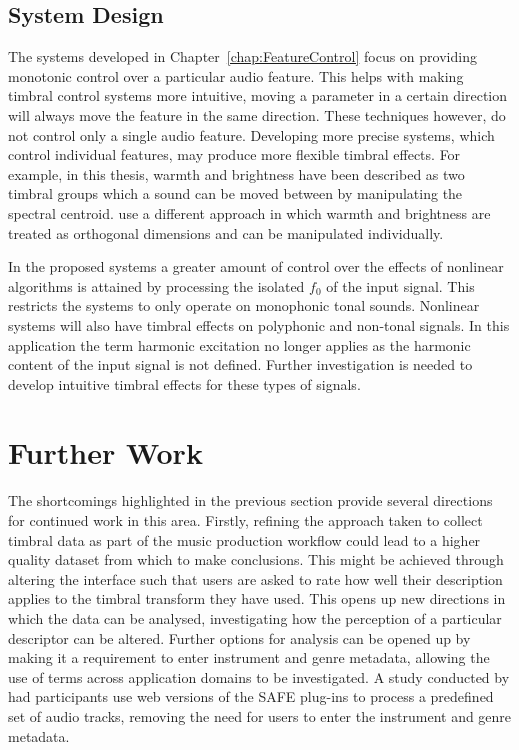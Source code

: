 	\subsection{System Design}
	\label{sec:Conclusion-Critique-SystemDesign}
		The systems developed in Chapter~\ref{chap:FeatureControl} focus on providing monotonic control over a
		particular audio feature. This helps with making timbral control systems more intuitive, moving a parameter
		in a certain direction will always move the feature in the same direction. These techniques however, do not
		control only a single audio feature. Developing more precise systems, which control individual features, may
		produce more flexible timbral effects. For example, in this thesis, warmth and brightness have been
		described as two timbral groups which a sound can be moved between by manipulating the spectral centroid.
		\cite{zacharakis2011an} use a different approach in which warmth and brightness are treated as orthogonal
		dimensions and can be manipulated individually.

		In the proposed systems a greater amount of control over the effects of nonlinear algorithms is attained by
		processing the isolated $f_{0}$ of the input signal. This restricts the systems to only operate on
		monophonic tonal sounds. Nonlinear systems will also have timbral effects on polyphonic and non-tonal
		signals. In this application the term harmonic excitation no longer applies as the harmonic content of the
		input signal is not defined. Further investigation is needed to develop intuitive timbral effects for these
		types of signals.

\section{Further Work}
\label{sec:Conclusion-FurtherWork}
	The shortcomings highlighted in the previous section provide several directions for continued work in this area.
	Firstly, refining the approach taken to collect timbral data as part of the music production workflow could lead to
	a higher quality dataset from which to make conclusions. This might be achieved through altering the interface such
	that users are asked to rate how well their description applies to the timbral transform they have used. This
	opens up new directions in which the data can be analysed, investigating how the perception of a particular
	descriptor can be altered. Further options for analysis can be opened up by making it a requirement to enter
	instrument and genre metadata, allowing the use of terms across application domains to be investigated. A study
	conducted by \citet{stasis2017audio} had participants use web versions of the SAFE plug-ins to process a predefined
	set of audio tracks, removing the need for users to enter the instrument and genre metadata.

